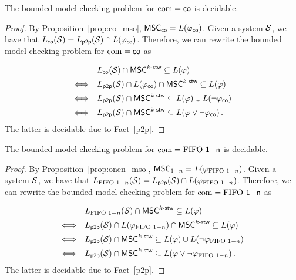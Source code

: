 \begin{theorem}
	\label{thm:co_bounded_model_checking}
	The bounded model-checking problem for $\textup{com} =  \mathsf{co}$ is decidable.
\end{theorem}
\begin{proof}
By Proposition~\ref{prop:co_mso}, $\mathsf{MSC}_{\mathsf{co}}=L(\varphi_{\mathsf{co}})$. Given a system $\mathcal{S}$, we have that $L_{\mathsf{co}}(\mathcal{S}) = L_{\mathsf{p2p}}(\mathcal{S}) \cap L(\varphi_{\mathsf{co}})$. Therefore, we can rewrite the bounded model checking problem for $\textup{com} = \mathsf{co}$ as

\[\begin{array}{rl}
&L_{\mathsf{co}}(\mathcal{S}) \cap \mathsf{MSC}^{k\textup{-}\mathsf{stw}} \subseteq L(\varphi)\\[1ex]
\Longleftrightarrow &L_{\mathsf{p2p}}(\mathcal{S}) \cap L(\varphi_{\mathsf{co}}) \cap \mathsf{MSC}^{k\textup{-}\mathsf{stw}} \subseteq L(\varphi)\\[1ex]
\Longleftrightarrow &L_{\mathsf{p2p}}(\mathcal{S}) \cap \mathsf{MSC}^{k\textup{-}\mathsf{stw}} \subseteq L(\varphi) \cup L(\neg \varphi_{\mathsf{co}})\\[1ex]
\Longleftrightarrow &L_{\mathsf{p2p}}(\mathcal{S}) \cap \mathsf{MSC}^{k\textup{-}\mathsf{stw}} \subseteq L(\varphi \vee \neg \varphi_{\mathsf{co}})\,.
\end{array}\]
The latter is decidable due to Fact~\ref{p2p}.
\end{proof}

\begin{theorem}
	\label{thm:onen_bounded_model_checking}
	The bounded model-checking problem for $\textup{com} =  \mathsf{\text{FIFO } 1\mathsf{-}n}$ is decidable.
\end{theorem}
\begin{proof}
By Proposition~\ref{prop:onen_mso}, $\mathsf{MSC}_{1\mathsf{-}n}=L(\varphi_{\text{FIFO } 1\mathsf{-}n})$. Given a system $\mathcal{S}$, we have that $L_{\text{FIFO } 1\mathsf{-}n}(\mathcal{S}) = L_{\mathsf{p2p}}(\mathcal{S}) \cap L(\varphi_{\text{FIFO } 1\mathsf{-}n})$. Therefore, we can rewrite the bounded model checking problem for $\textup{com} = \mathsf{\text{FIFO } 1\mathsf{-}n}$ as

\[\begin{array}{rl}
&L_{\text{FIFO } 1\mathsf{-}n}(\mathcal{S}) \cap \mathsf{MSC}^{k\textup{-}\mathsf{stw}} \subseteq L(\varphi)\\[1ex]
\Longleftrightarrow &L_{\mathsf{p2p}}(\mathcal{S}) \cap L(\varphi_{\text{FIFO } 1\mathsf{-}n}) \cap \mathsf{MSC}^{k\textup{-}\mathsf{stw}} \subseteq L(\varphi)\\[1ex]
\Longleftrightarrow &L_{\mathsf{p2p}}(\mathcal{S}) \cap \mathsf{MSC}^{k\textup{-}\mathsf{stw}} \subseteq L(\varphi) \cup L(\neg \varphi_{\text{FIFO } 1\mathsf{-}n})\\[1ex]
\Longleftrightarrow &L_{\mathsf{p2p}}(\mathcal{S}) \cap \mathsf{MSC}^{k\textup{-}\mathsf{stw}} \subseteq L(\varphi \vee \neg \varphi_{\text{FIFO } 1\mathsf{-}n})\,.
\end{array}\]
The latter is decidable due to Fact~\ref{p2p}.
\end{proof}

